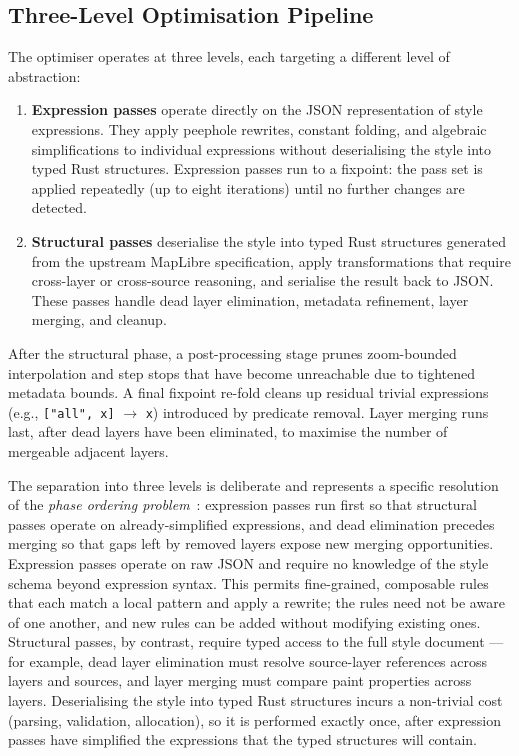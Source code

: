 \subsection{Three-Level Optimisation Pipeline}\label{sub_pipeline}

The optimiser operates at three levels, each targeting a different level of abstraction:

\begin{enumerate}
    \item \textbf{Expression passes} operate directly on the JSON representation of style expressions.
    They apply peephole rewrites, constant folding, and algebraic simplifications to individual expressions without deserialising the style into typed Rust structures.
    Expression passes run to a fixpoint: the pass set is applied repeatedly (up to eight iterations) until no further changes are detected.

    \item \textbf{Structural passes} deserialise the style into typed Rust structures generated from the upstream MapLibre specification, apply transformations that require cross-layer or cross-source reasoning, and serialise the result back to JSON.
    These passes handle dead layer elimination, metadata refinement, layer merging, and cleanup.
\end{enumerate}

After the structural phase, a post-processing stage prunes zoom-bounded interpolation and step stops that have become unreachable due to tightened metadata bounds.
A final fixpoint re-fold cleans up residual trivial expressions (e.g., \texttt{["all",~x]} $\to$ \texttt{x}) introduced by predicate removal.
Layer merging runs last, after dead layers have been eliminated, to maximise the number of mergeable adjacent layers.

The separation into three levels is deliberate and represents a specific resolution of the \emph{phase ordering problem}~\cite{clickCombiningAnalysesCombining1995}: expression passes run first so that structural passes operate on already-simplified expressions, and dead elimination precedes merging so that gaps left by removed layers expose new merging opportunities.
Expression passes operate on raw JSON and require no knowledge of the style schema beyond expression syntax.
This permits fine-grained, composable rules that each match a local pattern and apply a rewrite; the rules need not be aware of one another, and new rules can be added without modifying existing ones.
Structural passes, by contrast, require typed access to the full style document --- for example, dead layer elimination must resolve source-layer references across layers and sources, and layer merging must compare paint properties across layers.
Deserialising the style into typed Rust structures incurs a non-trivial cost (parsing, validation, allocation), so it is performed exactly once, after expression passes have simplified the expressions that the typed structures will contain.

